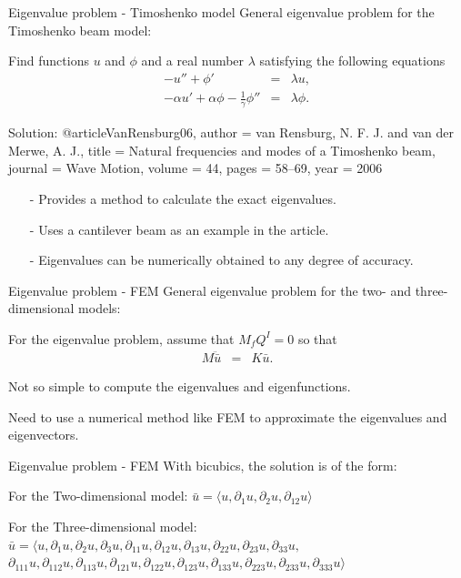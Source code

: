 \documentclass{beamer}
\begin{document}
\begin{frame}{Eigenvalue problem - Timoshenko model}
    General eigenvalue problem for the Timoshenko beam model:

    Find functions $u$ and $\phi$ and a real number $\lambda$ satisfying the following equations
    \begin{eqnarray}
    -u'' + \phi' &=& \lambda u, \label{eq:Timo:EigenvalueProblem1}\\
    -\alpha u' + \alpha\phi - \frac{1}{\gamma}\phi'' &=& \lambda\phi.\label{eq:Timo:EigenvalueProblem2}
    \end{eqnarray}

    Solution:
    @article{VanRensburg06,
  author  = {van Rensburg, N. F. J. and van der Merwe, A. J.},
  title   = {Natural frequencies and modes of a Timoshenko beam},
  journal = {Wave Motion},
  volume  = {44},
  pages   = {58--69},
  year    = {2006}
}

\begin{itemize}
    \item[-] Provides a method to calculate the exact eigenvalues.
    \item[-] Uses a cantilever beam as an example in the article.
    \item[-] Eigenvalues can be numerically obtained to any degree of accuracy.
\end{itemize}

\end{frame}


\begin{frame}{Eigenvalue problem - FEM}
General eigenvalue problem for the two- and three-dimensional models:

    For the eigenvalue problem, assume that $M_{f}Q^I = 0$ so that 
\begin{eqnarray}
		M\ddot{\bar{u}} & = & K\bar{u}.\label{eq:2DFEM:M2}
\end{eqnarray}

Not so simple to compute the eigenvalues and eigenfunctions.

Need to use a numerical method like FEM to approximate the eigenvalues and eigenvectors.

\end{frame}

\begin{frame}{Eigenvalue problem - FEM}
With bicubics, the solution is of the form:

For the Two-dimensional model:
$\bar{u} = \langle u, \partial_1 u, \partial_2 u, \partial_{12} u \rangle$

For the Three-dimensional model:
$\bar{u} = \langle u, \partial_1 u, \partial_2 u, \partial_3 u, \partial_{11} u, \partial_{12}u, \partial_{13}u,\partial_{22}u,\partial_{23}u, \partial_{33}u,$\\$ \partial_{111}u, \partial_{112}u, \partial_{113}u, \partial_{121}u, \partial_{122}u, \partial_{123}u, \partial_{133}u,\partial_{223}u,\partial_{233}u,\partial_{333}u \rangle$
\end{frame}
\end{document}
